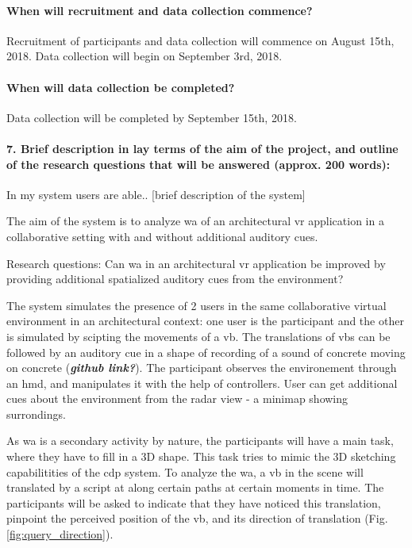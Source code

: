\paragraph{When will recruitment and data collection commence?}


Recruitment of participants and data collection will commence on August 15th, 2018. Data collection will begin on September 3rd, 2018.
\paragraph{When will data collection be completed?}


Data collection will be completed by September 15th, 2018.
\paragraph{7.	Brief description in lay terms of the aim of the project, and outline of the research questions that will be answered (approx. 200 words):}


In my system users are able.. [brief description of the system]

The aim of the system is to analyze \gls{wa} of an architectural \gls{vr} application in a collaborative setting with and without additional auditory cues. \newline

Research questions: Can \gls{wa} in an architectural \gls{vr} application be improved by providing additional spatialized auditory cues from the environment? \newline

The system simulates the presence of 2 users in the same collaborative virtual environment in an architectural context: one user is the participant and the other is simulated by scipting the movements of a \gls{vb}. The translations of \gls{vb}s can be followed by an auditory cue in a shape of recording of a sound of concrete moving on concrete (\textbf{\textit{github link?}}). The participant observes the environement through an \gls{hmd}, and manipulates it with the help of controllers. User can get additional cues about the environment from the radar view - a minimap showing surrondings.  \newline

As \gls{wa} is a secondary activity by nature, the participants will have a main task, where they have to fill in a 3D shape. This task tries to mimic the 3D sketching capabilitities of the \gls{cdp} system. To analyze the \gls{wa}, a \gls{vb} in the scene will translated by a script at along certain paths at certain moments in time. The participants will be asked to indicate that they have noticed this translation, pinpoint the perceived position of the \gls{vb}, and its direction of translation (Fig. \ref{fig:query_direction}). 

